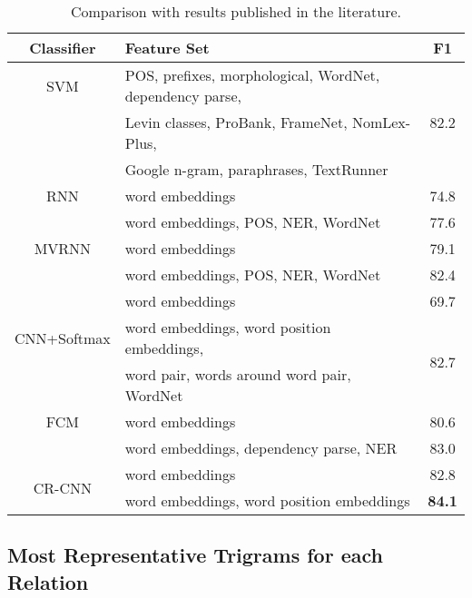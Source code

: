 \documentclass[11pt]{article}
\begin{document}
\begin{table*}[ht!]
\begin{small}
\begin{center}
\begin{tabular}{|c|l|c|}
\hline  \bf Classifier & \bf Feature Set & \bf F1 \\
\hline
SVM  & POS, prefixes, morphological, WordNet, dependency parse,  & \multirow{3}{*}{82.2}\\
\cite{rink:2010} & Levin classes, ProBank, FrameNet, NomLex-Plus, &  \\
& Google n-gram, paraphrases, TextRunner  & \\
\hline
RNN & word embeddings & 74.8 \\
\cite{socher:2012:emnlp} & word embeddings, POS, NER, WordNet & 77.6 \\
\hline
MVRNN &  word embeddings & 79.1 \\
\cite{socher:2012:emnlp} & word embeddings, POS, NER, WordNet & 82.4 \\
\hline
             & word embeddings & 69.7 \\
CNN+Softmax  & word embeddings, word position embeddings, & \multirow{2}{*}{82.7} \\
\cite{zeng2014:coling} & word pair, words around word pair, WordNet & \\
\hline
FCM & word embeddings & 80.6 \\
\cite{yu2014} & word embeddings, dependency parse, NER & 83.0 \\
\hline
\multirow{2}{*}{CR-CNN} & word embeddings & 82.8 \\
    & word embeddings, word position embeddings & \bf 84.1 \\
\hline
\end{tabular}
\end{center}
\end{small}
\caption{\label{tab:res:state_of_the_art} Comparison with results published in the literature.}
\end{table*}



\subsection{Most Representative Trigrams for each Relation}
\end{document}
